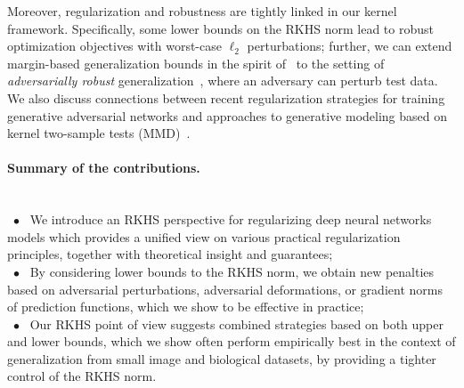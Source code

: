 Moreover, regularization and robustness are tightly linked in our kernel framework.
Specifically, some lower bounds on the RKHS norm lead to robust optimization objectives with worst-case $\ell_2$ perturbations;
further, we can extend margin-based generalization bounds in the spirit
of~\citet{bartlett2017spectrally,boucheron2005theory} to the setting of \emph{adversarially robust}
generalization~\citep[see][]{schmidt2018adversarially}, where an adversary can perturb test data.
We also discuss connections between recent regularization strategies for training generative adversarial networks
and approaches to generative modeling based on kernel two-sample tests (MMD)~\citep{dziugaite2015training,li2017mmd,binkowski2018demystifying}.

\vspace{-0.2cm}
\paragraph{Summary of the contributions.} ~ \\
~$\bullet$~ We introduce an RKHS perspective for regularizing deep neural networks models which provides
	a unified view on various practical regularization principles,
	together with theoretical insight and guarantees;\\
	~$\bullet$~ By considering lower bounds to the RKHS norm, we obtain new penalties based on adversarial perturbations,
	adversarial deformations, or gradient norms of prediction functions, which we show to be effective in practice; \\
	~$\bullet$~ Our RKHS point of view suggests combined strategies based on both upper and
	lower bounds, which we show often perform empirically best in the context of generalization from small image and biological datasets,
	by providing a tighter control of the RKHS norm.


\vspace{-0.2cm}
